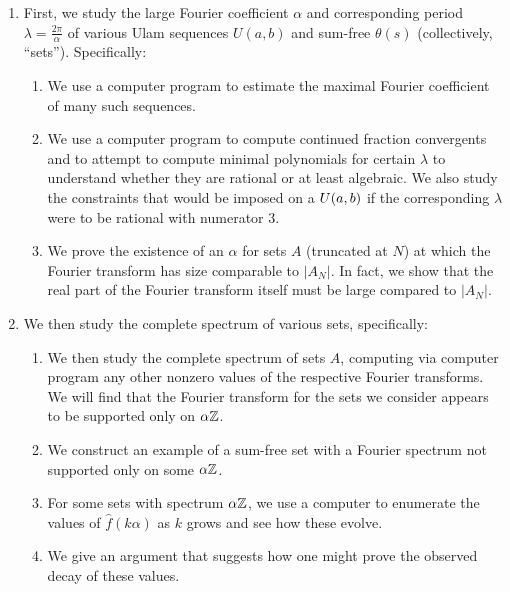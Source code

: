\documentclass{article}
\theoremstyle{definition}
\theoremstyle{remark}
\numberwithin{equation}{section}
\begin{document}
\begin{enumerate}
\item First, we study the large Fourier coefficient $\alpha$ and
  corresponding period $\lambda = \frac{2\pi}{\alpha}$ of various Ulam
  sequences $U(a,b)$ and sum-free $\theta(s)$ (collectively,
  ``\relevant sets'').  Specifically:
  \begin{enumerate}
  \item We use a computer program to estimate the maximal Fourier
    coefficient of many such sequences.
  \item We use a computer program to compute continued fraction
    convergents and to attempt to compute minimal polynomials for
    certain $\lambda$ to understand whether they are rational or at
    least algebraic.  We also study the constraints that would be
    imposed on a $U(a,b)$ if the corresponding $\lambda$ were to
    be rational with numerator 3.
  \item We prove the existence of an $\alpha$ for \relevant sets $A$
    (truncated at $N$) at which the Fourier transform has size
    comparable to $|A_N|$.  In fact, we show that the real part of the
    Fourier transform itself must be large compared to $|A_N|$.
  \end{enumerate}

\item We then study the complete spectrum of various \relevant sets,
  specifically:
  \begin{enumerate}
  \item We then study the complete spectrum of \relevant sets $A$,
    computing via computer program any other nonzero values of the
    respective Fourier transforms.  We will find that the Fourier
    transform for the sets we consider appears to be supported only on
    $\alpha\mathbb{Z}$.
  \item We construct an example of a sum-free set with a Fourier
    spectrum not supported only on some $\alpha\mathbb{Z}$.
  \item For some \relevant sets with spectrum $\alpha\mathbb{Z}$, we use a
    computer to enumerate the values of $\widehat{f}(k\alpha)$ as $k$
    grows and see how these evolve.
  \item We give an argument that suggests how one might prove the
    observed decay of these values.
  \end{enumerate}


\end{enumerate}
\end{document}
